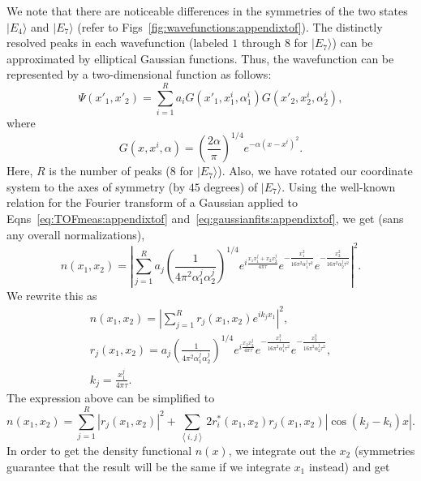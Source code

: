 We note that there are noticeable differences in the symmetries of the two states $|E_4\rangle$ and $|E_7\rangle$ (refer to Figs~\ref{fig:wavefunctions:appendixtof}). The distinctly resolved peaks in each wavefunction (labeled $1$ through $8$ for $|E_7\rangle$) can be approximated by elliptical Gaussian functions. Thus, the wavefunction can be represented by  a two-dimensional function as follows:
\begin{equation}
\Psi(x'_1, x'_2) = \sum_{i=1}^{R} {a_i}G\left( x'_1, x^i_1, \alpha^i_1\right) G\left( x'_2, x^i_2, \alpha^i_2\right),
\label{eq:gaussianfits:appendixtof}
\end{equation}
where
\begin{equation}
G(x,x^i,\alpha) =\left( \frac{2\alpha}{\pi}\right)^{1/4} e^{-\alpha \left(x-x^i \right)^2}.
\end{equation}
Here, $R$ is the number of peaks (8 for $|E_7\rangle$). Also,  we have rotated our coordinate system to the axes of symmetry (by $45$ degrees) of $|E_7\rangle$. Using the well-known relation for the Fourier transform of a Gaussian applied to Eqns~\ref{eq:TOFmeas:appendixtof} and~\ref{eq:gaussianfits:appendixtof}, we get (sans any overall normalizations), 
\begin{equation}
n(x_1,x_2) = | \sum_{j=1}^{R} a_j \left(\frac{1}{4\pi^2 \alpha^j_1\alpha^j_2}  \right)^{1/4} e^{i\frac{x_1x^j_1 + x_2x^j_2}{4\pi\tau}} e^{-\frac{x^2_1}{16\pi^2 \alpha^j_1\tau^2}} e^{-\frac{x^2_2}{16\pi^2 \alpha^j_2\tau^2}} |^2.
\label{eq:gaussianfitsexpand:appendixtof}
\end{equation}
We rewrite this as 
\begin{eqnarray}
n(x_1,x_2)=| \sum_{j=1}^R r_j(x_1,x_2) e^{i k_j x_1} |^2, \nonumber \\
r_j(x_1,x_2)=a_j \left( \frac{1}{4\pi^2\alpha^j_1\alpha^j_2} \right)^{1/4} e^{i\frac{x_2 x^j_2}{4\pi\tau}} e^{-\frac{x^2_1}{16\pi^2\alpha^j_1\tau^2}} e^{-\frac{x^2_2}{16\pi^2\alpha^j_2\tau^2}}, \nonumber \\
k_j = \frac{ x^j_1}{4\pi\tau}.
\label{eq:rthetasplit:appendixtof}
\end{eqnarray}
The expression above can be simplified to 
\begin{equation}
n(x_1,x_2)=\sum_{j=1}^{R}|r_j(x_1,x_2)|^2 + \sum_{\left\langle i,j \right\rangle} 2r^*_i(x_1,x_2) r_j(x_1,x_2) |\cos{(k_j-k_i)x}|.
\end{equation}
In order to get the density functional $n(x)$, we integrate out the $x_2$ (symmetries guarantee that the result will be the same if we integrate $x_1$ instead) and get
